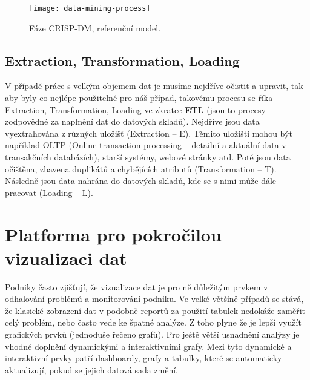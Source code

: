 \begin{figure}[!htp]
\centering
\texttt{[image: data-mining-process]}
\caption{Fáze CRISP-DM, referenční model.}
\label{crisp-dm}
\end{figure}

\subsection{Extraction, Transformation, Loading}
\par V případě práce s velkým objemem dat je musíme nejdříve očistit a upravit, tak aby byly co nejlépe použitelné pro náš případ, takovému procesu se říka Extraction, Transformation, Loading ve zkratce \textbf{ETL} (jsou to procesy zodpovědné za naplnění dat do datových skladů). Nejdříve jsou data vyextrahována z různých uložišť (Extraction -- E). Těmito uložišti mohou být například OLTP (Online transaction processing -- detailní a aktuální data v transakčních databázích), starší systémy, webové stránky atd. Poté jsou data očištěna, zbavena duplikátů a chybějících atributů  (Transformation -- T). Následně jsou data nahrána do datových skladů, kde se s nimi může dále pracovat (Loading -- L).


\section{Platforma pro pokročilou vizualizaci dat}
\par Podniky často zjišťují, že vizualizace dat je pro ně důležitým prvkem v odhalování problémů a monitorování podniku. Ve velké většině případů se stává, že klasické zobrazení dat v podobně reportů za použití tabulek nedokáže zaměřit celý problém, nebo často vede ke špatné analýze. Z toho plyne že je lepší využít grafických prvků (jednoduše řečeno grafů). Pro ještě větší usnadnění analýzy je vhodné doplnění dynamickými a interaktivními grafy. Mezi tyto dynamické a interaktivní prvky patří dashboardy, grafy a tabulky, které se automaticky aktualizují, pokud se jejich datová sada změní.

